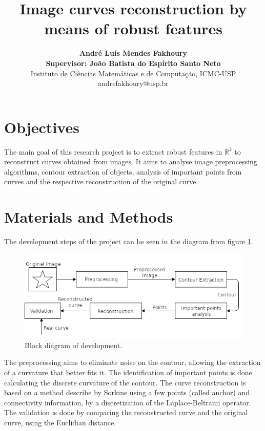 \documentclass[a4paper,10pt,twocolumn]{article}
\begin{document}
	\title{\large{\vspace{-1cm}\textbf{Image curves reconstruction by means of robust features}}}
	\author{\textbf{André Luís Mendes Fakhoury}\vspace{0.2cm}\\
		\textbf{Supervisor: João Batista do Espírito Santo Neto}\vspace{0.2cm}\\
		Instituto de Ciências Matemáticas e de Computação, ICMC-USP\vspace{0.1cm}\\
		\normalsize{andrefakhoury@usp.br \quad }
		}
	
	\date{\null}
	\maketitle
	
	\thispagestyle{fancy}
	
	\section*{\hfil Objectives}
	
	The main goal of this research project is to extract robust features in $\mathbb{R}^2$ to reconstruct curves obtained from images. It aims to analyse image preprocessing algorithms, contour extraction of objects, analysis of important points from curves and the respective reconstruction of the original curve.
	
	\section*{\hfil Materials and Methods}
	The development steps of the project can be seen in the diagram from figure \ref{fig:diagrama}.
	\begin{figure}[ht!]
	\centering
	\includegraphics[width=0.9\linewidth]{imagens/diagram.png}
	\caption{Block diagram of development.}
	\label{fig:diagrama}
	\end{figure}
	The preprocessing aims to eliminate noise on the contour, allowing the extraction of a curvature that better fits it. The identification of important points is done calculating the discrete curvature of the contour. The curve reconstruction is based on a method describe by Sorkine \cite{sorkine} using a few points (called anchor) and connectivity information, by a discretization of the Laplace-Beltrami operator. The validation is done by comparing the reconstructed curve and the original curve, using the Euclidian distance.
	
\end{document}
